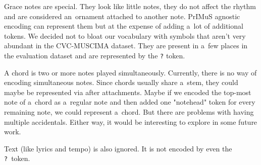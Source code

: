 Grace notes are special. They look like little notes, they do not affect the rhythm and are considered an~ornament attached to another note. PrIMuS agnostic encoding can represent them but at the expense of adding a~lot of additional tokens. We decided not to bloat our vocabulary with symbols that aren't very abundant in the CVC-MUSCIMA dataset. They are present in a~few places in the evaluation dataset and are represented by the \verb`?` token.

A chord is two or more notes played simultaneously. Currently, there is no way of encoding simultaneous notes. Since chords usually share a~stem, they could maybe be represented via after attachments. Maybe if we encoded the top-most note of a~chord as a~regular note and then added one "notehead" token for every remaining note, we could represent a~chord. But there are problems with having multiple accidentals. Either way, it would be interesting to explore in some future work.

Text (like lyrics and tempo) is also ignored. It is not encoded by even the \verb`?`~token.
